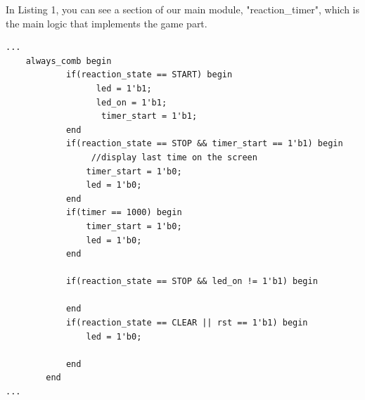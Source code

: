 \documentclass[11pt]{article}
\begin{document}
In Listing 1, you can see a section of our main module, "reaction\_timer", which is the main logic that implements the game part.
\begin{lstlisting}[style=Verilog,
caption=Main Logic of reaction\_timer,
label=code:ex 
]
...
	always_comb begin
	        if(reaction_state == START) begin
	              led = 1'b1;
	              led_on = 1'b1;
	               timer_start = 1'b1;
	        end    
	        if(reaction_state == STOP && timer_start == 1'b1) begin
	             //display last time on the screen
	            timer_start = 1'b0;
	            led = 1'b0;
	        end
	        if(timer == 1000) begin
		        timer_start = 1'b0;
		        led = 1'b0;
		    end
		    
	        if(reaction_state == STOP && led_on != 1'b1) begin
	            
	        end
	        if(reaction_state == CLEAR || rst == 1'b1) begin
	            led = 1'b0;
	            
	        end
	    end
...
\end{lstlisting}
\end{document}
